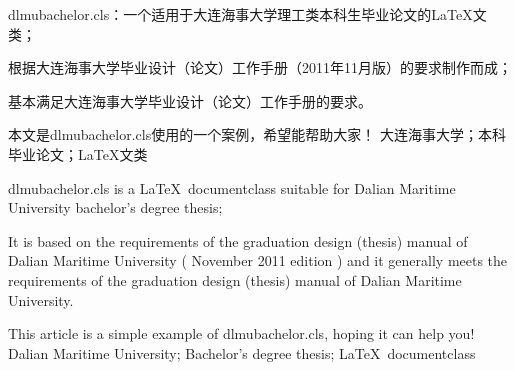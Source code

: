 \begin{cnabstract}
	dlmubachelor.cls：一个适用于大连海事大学理工类本科生毕业论文的\LaTeX 文类；

	根据大连海事大学毕业设计（论文）工作手册（2011年11月版）的要求制作而成；

	基本满足大连海事大学毕业设计（论文）工作手册的要求。

	本文是dlmubachelor.cls使用的一个案例，希望能帮助大家！
	\keywordscn 大连海事大学；本科毕业论文；\LaTeX 文类
\end{cnabstract}

\begin{enabstract}
	dlmubachelor.cls is a \LaTeX\ documentclass suitable for Dalian Maritime University bachelor's degree thesis;

	It is based on the requirements of the graduation design (thesis) manual of Dalian Maritime University ( November 2011 edition ) and it generally meets the requirements of the graduation design (thesis) manual of Dalian Maritime University.

	This article is a simple example of dlmubachelor.cls, hoping it can help you!
	\keywordsen Dalian Maritime University; Bachelor's degree thesis; \LaTeX\ documentclass
\end{enabstract}
